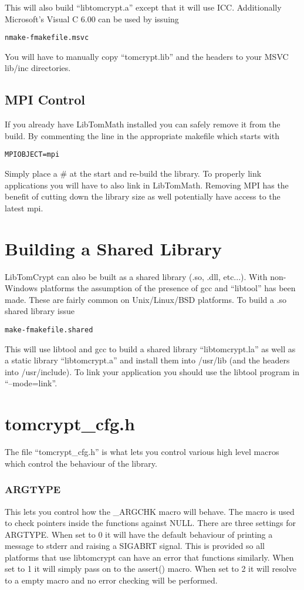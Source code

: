 \documentclass[a4paper]{book}
\begin{document}
This will also build ``libtomcrypt.a'' except that it will use ICC.  Additionally Microsoft's Visual C 6.00 can be used
by issuing

\begin{alltt}
nmake -f makefile.msvc
\end{alltt}

You will have to manually copy ``tomcrypt.lib'' and the headers to your MSVC lib/inc directories.

\subsection{MPI Control}
If you already have LibTomMath installed you can safely remove it from the build.  By commenting the line
in the appropriate makefile which starts with 

\begin{alltt}
MPIOBJECT=mpi
\end{alltt}

Simply place a \# at the start and re-build the library.  To properly link applications you will have to also
link in LibTomMath.  Removing MPI has the benefit of cutting down the library size as well potentially have access
to the latest mpi.

\section{Building a Shared Library}
LibTomCrypt can also be built as a shared library (.so, .dll, etc...).  With non-Windows platforms the assumption
of the presence of gcc and ``libtool'' has been made.  These are fairly common on Unix/Linux/BSD platforms.  To
build a .so shared library issue 

\begin{alltt}
make -f makefile.shared
\end{alltt}
This will use libtool and gcc to build a shared library ``libtomcrypt.la'' as well as a static library ``libtomcrypt.a''
and install them into /usr/lib (and the headers into /usr/include).  To link your application you should use the 
libtool program in ``--mode=link''.

\section{tomcrypt\_cfg.h}
The file ``tomcrypt\_cfg.h'' is what lets you control various high level macros which control the behaviour 
of the library. 

\subsubsection{ARGTYPE}
This lets you control how the \_ARGCHK macro will behave.  The macro is used to check pointers inside the functions against
NULL.  There are three settings for ARGTYPE.  When set to 0 it will have the default behaviour of printing a message to 
stderr and raising a SIGABRT signal.  This is provided so all platforms that use libtomcrypt can have an error that functions
similarly.  When set to 1 it will simply pass on to the assert() macro.  When set to 2 it will resolve to a empty macro
and no error checking will be performed.
\end{document}
